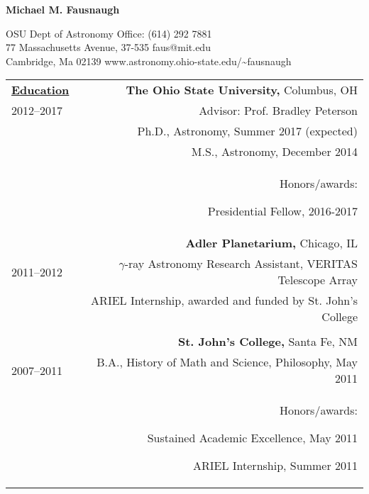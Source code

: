 \documentclass[letterpaper,12pt]{article}
\begin{document}
\begin{center}
\huge\bfseries{Michael M. Fausnaugh}
\end{center}

\noindent OSU Dept of Astronomy \hfill Office: (614) 292 7881 \\
77 Massachusetts Avenue, 37-535  \hfill faus@mit.edu\\
Cambridge, Ma 02139  \hfill  www.astronomy.ohio-state.edu/\textasciitilde fausnaugh

%

\vspace{2em}
\begin{longtable}{LR}

\underline{\textbf{Education}} &     

\textbf{The Ohio State University,} Columbus, OH\\
2012--2017   &    Advisor:  Prof. Bradley Peterson\\
&Ph.D., Astronomy, Summer 2017 (expected)\\
&    M.S.,  Astronomy, December 2014\\
&    Honors/awards:
\begin{compactitem}
\item Presidential Fellow, 2016-2017
\end{compactitem}

\\

&\textbf{Adler Planetarium,} Chicago, IL\\
2011--2012&    $\gamma$-ray Astronomy Research Assistant, VERITAS Telescope Array\\
&  ARIEL Internship, awarded and funded by St. John's College \\

\\
&\textbf{St. John's College,} Santa Fe, NM\\
2007--2011&B.A., History of Math and Science, Philosophy,  May 2011\\
&Honors/awards: 
\begin{compactitem} 
\item Sustained Academic Excellence, May 2011
\item  ARIEL Internship, Summer 2011
\end{compactitem}
\\





\end{longtable}
\end{document}
